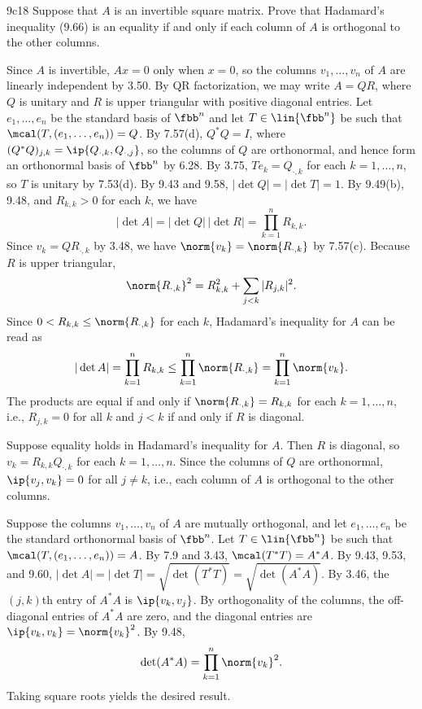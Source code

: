 \begin{exercise}{9c18}
    Suppose that $A$ is an invertible square matrix.
    Prove that Hadamard's inequality (9.66) is an equality if and only if each column of $A$ is orthogonal to the other columns.
\end{exercise}

\begin{sol}
    Since $A$ is invertible, $A x = 0$ only when $x = 0$, so the columns $v_1, \ldots, v_n$ of $A$ are linearly independent by 3.50.
    By QR factorization, we may write $A = QR$, where $Q$ is unitary and $R$ is upper triangular with positive diagonal entries.
    Let $e_1, \ldots, e_n$ be the standard basis of $\fbb^n$ and let $T \in \lin{\fbb^n}$ be such that $\mcal(T, (e_1, \ldots, e_n)) = Q$.
    By 7.57(d), $Q^\ast Q = I$, where $(Q^\ast Q)_{j, k} = \ip{Q_{\cdot, k}, Q_{\cdot, j}}$, so the columns of $Q$ are orthonormal, and hence form an orthonormal basis of $\fbb^n$ by 6.28.
    By 3.75, $T e_k = Q_{\cdot, k}$ for each $k = 1, \ldots, n$, so $T$ is unitary by 7.53(d).
    By 9.43 and 9.58, $|\det Q| = |\det T| = 1$.
    By 9.49(b), 9.48, and $R_{k, k} > 0$ for each $k$, we have
    \[
        |\det A| = |\det Q|\,|\det R| = \prod_{k=1}^n R_{k,k}.
    \]
    Since $v_k = Q R_{\cdot, k}$ by 3.48, we have $\norm{v_k} = \norm{R_{\cdot, k}}$ by 7.57(c).
    Because $R$ is upper triangular,
    \[
        \norm{R_{\cdot, k}}^2 = R_{k,k}^2 + \sum_{j < k} |R_{j,k}|^2.
    \]
    Since $0 < R_{k,k} \leq \norm{R_{\cdot, k}}$ for each $k$, Hadamard's inequality for $A$ can be read as
    \[
        |\det A| = \prod_{k=1}^n R_{k,k} \leq \prod_{k=1}^n \norm{R_{\cdot, k}} = \prod_{k=1}^n \norm{v_k}.
    \]
    The products are equal if and only if $\norm{R_{\cdot, k}} = R_{k,k}$ for each $k = 1, \ldots, n$, i.e., $R_{j,k} = 0$ for all $k$ and $j < k$ if and only if $R$ is diagonal.

    \rightimp Suppose equality holds in Hadamard's inequality for $A$.
    Then $R$ is diagonal, so $v_k = R_{k, k} Q_{\cdot, k}$ for each $k = 1, \ldots, n$.
    Since the columns of $Q$ are orthonormal, $\ip{v_j, v_k} = 0$ for all $j \neq k$, i.e., each column of $A$ is orthogonal to the other columns.

    \leftimp Suppose the columns $v_1, \dots, v_n$ of $A$ are mutually orthogonal, and let $e_1, \ldots, e_n$ be the standard orthonormal basis of $\fbb^n$.
    Let $T \in \lin{\fbb^n}$ be such that $\mcal(T, (e_1, \ldots, e_n)) = A$.
    By 7.9 and 3.43, $\mcal(T^\ast T) = A^\ast A$.
    By 9.43, 9.53, and 9.60, $|\det A| = |\det T| = \sqrt{\det(T^\ast T)} = \sqrt{\det(A^\ast A)}$.
    By 3.46, the $(j,k)$th entry of $A^\ast A$ is $\ip{v_k, v_j}$.
    By orthogonality of the columns, the off-diagonal entries of $A^\ast A$ are zero, and the diagonal entries are $\ip{v_k, v_k} = \norm{v_k}^2$.
    By 9.48,
    \[
        \det(A^\ast A) = \prod_{k=1}^n \norm{v_k}^2.
    \]
    Taking square roots yields the desired result.
\end{sol}

